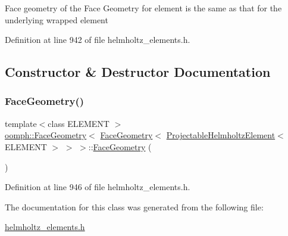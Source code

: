 Face geometry of the Face Geometry for element is the same as that for the underlying wrapped element 

Definition at line 942 of file helmholtz\+\_\+elements.\+h.



\subsection{Constructor \& Destructor Documentation}
\mbox{\label{classoomph_1_1FaceGeometry_3_01FaceGeometry_3_01ProjectableHelmholtzElement_3_01ELEMENT_01_4_01_4_01_4_a1c18512b25c22baad12b1789767a7ce5}} 
\subsubsection{\texorpdfstring{Face\+Geometry()}{FaceGeometry()}}
{\footnotesize\ttfamily template$<$class E\+L\+E\+M\+E\+NT $>$ \\
\hyperlink{classoomph_1_1FaceGeometry}{oomph\+::\+Face\+Geometry}$<$ \hyperlink{classoomph_1_1FaceGeometry}{Face\+Geometry}$<$ \hyperlink{classoomph_1_1ProjectableHelmholtzElement}{Projectable\+Helmholtz\+Element}$<$ E\+L\+E\+M\+E\+NT $>$ $>$ $>$\+::\hyperlink{classoomph_1_1FaceGeometry}{Face\+Geometry} (\begin{DoxyParamCaption}{ }\end{DoxyParamCaption})\hspace{0.3cm}{\ttfamily [inline]}}



Definition at line 946 of file helmholtz\+\_\+elements.\+h.



The documentation for this class was generated from the following file\+:\begin{DoxyCompactItemize}
\item 
\hyperlink{helmholtz__elements_8h}{helmholtz\+\_\+elements.\+h}\end{DoxyCompactItemize}
